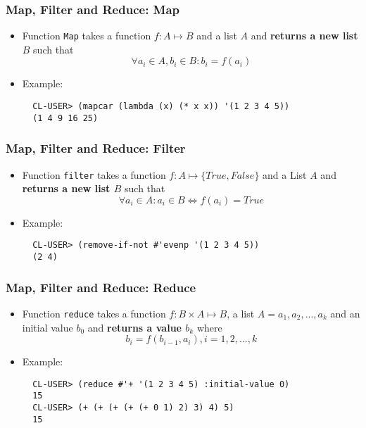 \documentclass{beamer}
\begin{document}
\begin{frame}[fragile]
  \frametitle{Map, Filter and Reduce: Map}
  \begin{itemize}
  \item Function \texttt{Map} takes a function $f: A \mapsto B$ and a
    list $A$ and \textbf{returns a new list $B$} such that
    $$\forall a_i \in A, b_i \in B: b_i = f(a_i)$$
  \item Example:
\begin{verbatim}
  CL-USER> (mapcar (lambda (x) (* x x)) '(1 2 3 4 5))
  (1 4 9 16 25)
\end{verbatim}
  \end{itemize}
\end{frame}

\begin{frame}[fragile]
  \frametitle{Map, Filter and Reduce: Filter}
  \begin{itemize}
  \item Function \texttt{filter} takes a function
    $f: A \mapsto \{True, False\}$ and a List $A$ and \textbf{returns a new list
      $B$} such that
    $$\forall a_i \in A: a_i \in B \iff f(a_i) = True$$
  \item Example:
\begin{verbatim}
  CL-USER> (remove-if-not #'evenp '(1 2 3 4 5))
  (2 4)
\end{verbatim}
  \end{itemize}
\end{frame}

\begin{frame}[fragile]
  \frametitle{Map, Filter and Reduce: Reduce}
  \begin{itemize}
  \item Function \texttt{reduce} takes a function
    $f: B \times A \mapsto B$, a list $A = {a_1, a_2, ..., a_k}$ and an initial
    value $b_0$ and \textbf{returns a value $b_k$} where
    $$b_i = f(b_{i-1}, a_i), i=1,2,...,k$$
  \item Example:
\begin{verbatim}
  CL-USER> (reduce #'+ '(1 2 3 4 5) :initial-value 0)
  15
  CL-USER> (+ (+ (+ (+ (+ 0 1) 2) 3) 4) 5)
  15
\end{verbatim}
  \end{itemize}
\end{frame}
\end{document}
